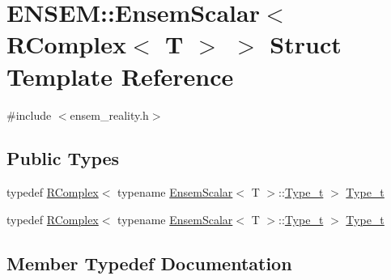 \hypertarget{structENSEM_1_1EnsemScalar_3_01RComplex_3_01T_01_4_01_4}{}\section{E\+N\+S\+EM\+:\+:Ensem\+Scalar$<$ R\+Complex$<$ T $>$ $>$ Struct Template Reference}
\label{structENSEM_1_1EnsemScalar_3_01RComplex_3_01T_01_4_01_4}


{\ttfamily \#include $<$ensem\+\_\+reality.\+h$>$}

\subsection*{Public Types}
\begin{DoxyCompactItemize}
\item 
typedef \mbox{\hyperlink{classENSEM_1_1RComplex}{R\+Complex}}$<$ typename \mbox{\hyperlink{structENSEM_1_1EnsemScalar}{Ensem\+Scalar}}$<$ T $>$\+::\mbox{\hyperlink{structENSEM_1_1EnsemScalar_3_01RComplex_3_01T_01_4_01_4_abd854cbfbb45aac23836c31aa0a35076}{Type\+\_\+t}} $>$ \mbox{\hyperlink{structENSEM_1_1EnsemScalar_3_01RComplex_3_01T_01_4_01_4_abd854cbfbb45aac23836c31aa0a35076}{Type\+\_\+t}}
\item 
typedef \mbox{\hyperlink{classENSEM_1_1RComplex}{R\+Complex}}$<$ typename \mbox{\hyperlink{structENSEM_1_1EnsemScalar}{Ensem\+Scalar}}$<$ T $>$\+::\mbox{\hyperlink{structENSEM_1_1EnsemScalar_3_01RComplex_3_01T_01_4_01_4_abd854cbfbb45aac23836c31aa0a35076}{Type\+\_\+t}} $>$ \mbox{\hyperlink{structENSEM_1_1EnsemScalar_3_01RComplex_3_01T_01_4_01_4_abd854cbfbb45aac23836c31aa0a35076}{Type\+\_\+t}}
\end{DoxyCompactItemize}


\subsection{Member Typedef Documentation}
\mbox{\label{structENSEM_1_1EnsemScalar_3_01RComplex_3_01T_01_4_01_4_abd854cbfbb45aac23836c31aa0a35076}} 
